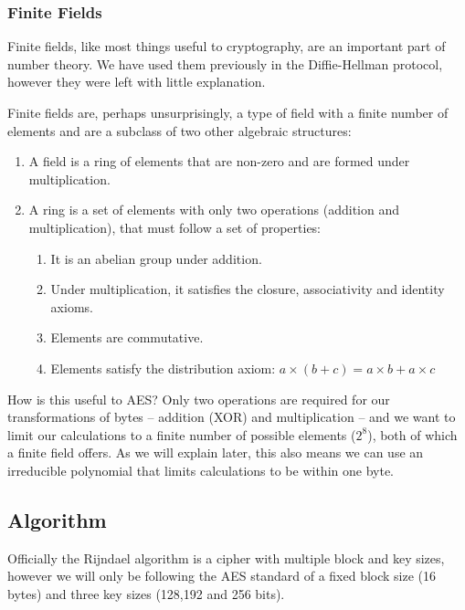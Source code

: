     \subsubsection{Finite Fields}
    
    Finite fields, like most things useful to cryptography, are an important part of number theory. We have used them previously in the Diffie-Hellman protocol, however they were left with little explanation. 
    
    Finite fields are, perhaps unsurprisingly, a type of field with a finite number of elements and are a subclass of two other algebraic structures:
    
    \begin{enumerate}
      \item A field is a ring of elements that are non-zero and are formed under multiplication.
      \item A ring is a set of elements with only two operations (addition and multiplication), that must follow a set of properties:
      \begin{enumerate}
        \item It is an abelian group under addition.
        \item Under multiplication, it satisfies the closure, associativity and identity axioms.
        \item Elements are commutative.
        \item Elements satisfy the distribution axiom: $a \times (b + c) = a \times b + a \times c$
      \end{enumerate}
    \end{enumerate}
    
    How is this useful to AES? Only two operations are required for our transformations of bytes -- addition (XOR) and multiplication -- and we want to limit our calculations to a finite number of possible elements ($2^8$), both of which a finite field offers. As we will explain later, this also means we can use an irreducible polynomial that limits calculations to be within one byte.
    
  \subsection{Algorithm}
  \label{subsec:aes_algo}
    
    Officially the Rijndael algorithm is a cipher with multiple block and key sizes, however we will only be following the AES standard of a fixed block size (16 bytes) and three key sizes (128,192 and 256 bits).
    
